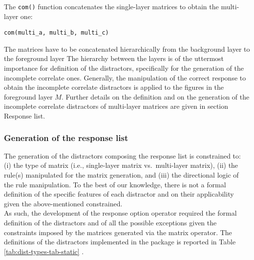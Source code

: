 The \texttt{com()} function concatenates the single-layer matrices to obtain the multi-layer one:

\begin{verbatim}
com(multi_a, multi_b, multi_c)
\end{verbatim}

The matrices have to be concatenated hierarchically from the background layer to the foreground layer The hierarchy between the layers is of the uttermost importance for definition of the distractors, specifically for the generation of the incomplete correlate ones.
Generally, the manipulation of the correct response to obtain the incomplete correlate distractors is applied to the figures in the foreground layer \(M\).
Further details on the definition and on the generation of the incomplete correlate distractors of multi-layer matrices are given in section Response list.

\subsubsection{Generation of the response list}\label{generation-of-the-response-list}

The generation of the distractors composing the response list is constrained to: (i) the type of matrix (i.e., single-layer matrix vs.~multi-layer matrix), (ii) the rule(s) manipulated for the matrix generation, and (iii) the directional logic of the rule manipulation.
To the best of our knowledge, there is not a formal definition of the specific features of each distractor and on their applicability given the above-mentioned constrained.\\
As such, the development of the response option operator required the formal definition of the distractors and of all the possible exceptions given the constraints imposed by the matrices generated via the matrix operator.
The definitions of the distractors implemented in the  package is reported in Table \ref{tab:dist-types-tab-static} .

